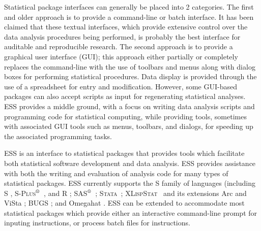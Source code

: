 \documentclass{article}
\newcommand*{\regstrd}{$^{\mbox{\scriptsize{\textregistered}}}$}
\newcommand*{\SAS}{\textsc{SAS}}
\newcommand*{\Splus}{\textsc{S-Plus}}
\newcommand*{\XLispStat}{\textsc{XLispStat}}
\newcommand*{\Stata}{\textsc{Stata}}
\begin{document}






Statistical package interfaces can generally be placed into 2
categories.  The first and older approach is to provide a command-line
or batch interface.  It has been claimed that these textual
interfaces, which provide extensive  control over the data analysis
procedures being performed, is probably the best interface for
auditable and reproducible research.
The second approach is to provide a graphical user interface (GUI);
this approach either partially or completely replaces the command-line
with the use of toolbars and menus along with dialog boxes for
performing statistical procedures.  Data display is provided through
the use of a spreadsheet for entry and modification.  However, some
GUI-based packages can also accept scripts as input for regenerating
statistical analyses.  ESS provides a middle ground, with a focus on
writing data analysis scripts and programming code for statistical
computing, while providing tools, sometimes with associated GUI tools
such as menus, toolbars, and dialogs, for speeding up the associated
programming tasks.

ESS is an interface to statistical packages that provides tools which
facilitate both statistical software development and data analysis.
ESS provides assistance with both the writing and evaluation of
analysis code for many types of statistical packages.  ESS currently
supports the S family of languages (including S
\citep{BecRCW88,ChaJH92,ChaJ98}, \Splus\regstrd\ \citep{Splus}, and R
\citep{ihak:gent:1996,R}; \SAS\regstrd\ \citep{SAS:8}; \Stata\
\citep{Stata:7.0}; \XLispStat\ \citep{Tier90} and its extensions Arc
\citep{Cook:Weisberg:1999} and ViSta \citep{youn:fald:mcfa:1992}; BUGS
\citep{BUGS}; and Omegahat \citep{DTLang:2000}.  ESS can be extended
to accommodate most statistical packages which provide either an
interactive command-line prompt for inputing instructions, or process
batch files for instructions.
\end{document}
